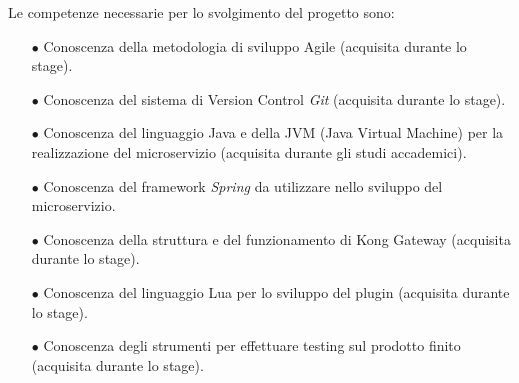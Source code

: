 Le competenze necessarie per lo svolgimento del progetto sono:
\begin{itemize}
	\item[$\bullet$]Conoscenza della metodologia di sviluppo Agile (acquisita durante lo stage).
	\item[$\bullet$]Conoscenza del sistema di Version Control \emph{Git} (acquisita durante lo stage).
	\item[$\bullet$]Conoscenza del linguaggio Java e della JVM (Java Virtual Machine) per la realizzazione del microservizio (acquisita durante gli studi accademici).
	\item[$\bullet$]Conoscenza del framework \emph{Spring} da utilizzare nello sviluppo del microservizio.
	\item[$\bullet$]Conoscenza della struttura e del funzionamento di Kong Gateway (acquisita durante lo stage).
	\item[$\bullet$]Conoscenza del linguaggio Lua per lo sviluppo del plugin (acquisita durante lo stage).
	\item[$\bullet$]Conoscenza degli strumenti per effettuare testing sul prodotto finito (acquisita durante lo stage).
\end{itemize}

